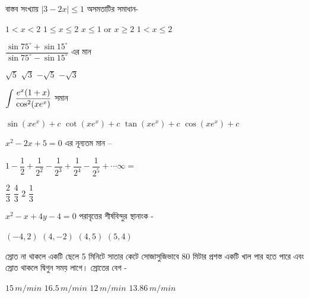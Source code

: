\documentclass[addpoints]{exam}
\begin{document}
\begin{questions}
\question বাস্তব সংখ্যায় $ |3-2x|\le 1 $ অসমতাটির সমাধান-

\begin{oneparchoices}
\choice $ 1<x<2 $
\choice $ 1\le x \le 2 $
\choice $ x\le 1$ or $ x\ge 2 $
\choice $ 1<x\le 2 $
\end{oneparchoices}

\question $ \dfrac{\sin 75^{\circ}+\sin 15^{\circ}}{\sin 75^{\circ}-\sin 15^{\circ}} $ এর মান

\begin{oneparchoices}
\choice $ \sqrt{5} $
\choice $ \sqrt{3} $
\choice $ -\sqrt{5} $
\choice $ -\sqrt{3} $
\end{oneparchoices}

\question $ \mathlarger{\int \dfrac{e^{x}(1+x)}{\cos^{2}(xe^{x})}} $ সমান

\begin{oneparchoices}
\choice $ \sin (xe^{x}) +c $
\choice $ \cot (xe^{x}) +c $
\choice $ \tan (xe^{x}) +c $
\choice $ \cos (xe^{x}) +c$
\end{oneparchoices}

\question  $ x^{2}-2x+5=0 $ এর নূন্যতম মান – 

\begin{oneparchoices}
\end{oneparchoices}

\question  $ 1-\dfrac{1}{2}+\dfrac{1}{2^{2}}-\dfrac{1}{2^{3}}+\dfrac{1}{2^{4}}-\dfrac{1}{2^{5}}+\cdots \infty = $ 

\begin{oneparchoices}
\choice $ \dfrac{2}{3} $
\choice $ \dfrac{4}{3} $
\choice $ 2 $
\choice $ \dfrac{1}{3} $
\end{oneparchoices}

\question $ x^{2}-x+4y-4=0 $ পরাবৃত্তের শীর্ষবিন্দুর স্থানাংক -

\begin{oneparchoices}
\choice $ (-4,2) $
\choice $ (4,-2) $
\choice $ (4,5) $
\choice  $ (5,4) $
\end{oneparchoices}

\question স্রোত না থাকলে একটি ছেলে 5 মিনিটে সাতার কেটে সোজাসুজিভাবে 80 মিটার প্রশস্ত একটি খাল পার হতে পারে এবং স্রোত থাকলে দ্বিগুন সময় লাগে। স্রোতের বেগ -

\begin{oneparchoices}
\choice $ 15\,m/min $
\choice $ 16.5\,m/min $
\choice $ 12\,m/min $
\choice $ 13.86\,m/min $

\end{oneparchoices}


\end{questions}
\end{document}
